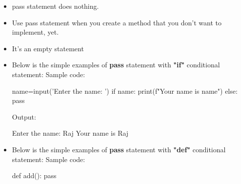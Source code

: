 \setlength{\columnsep}{3pt}


\begin{flushleft}

	
	\begin{itemize}

		\item pass statement does nothing.

		\item Use pass statement when you create a method that you
don't want to implement, yet.
		\item It's an empty statement
		\item Below is the simple examples of \textbf{pass} statement with \textbf{"if"} conditional statement:
		\newline
		Sample code:
		\begin{tcolorbox}[breakable,notitle,boxrule=-0pt,colback=code,colframe=code]
			\color{white}
			\font=8pt
			name=input('Enter the name: ') \newline
			if name: \newline
			\hphantom{} \hphantom{} print(f"Your name is {name}") \newline
			else: \newline
			\hphantom{} \hphantom{} pass
			\font=4pt
		\end{tcolorbox}

		
		Output:
		\begin{tcolorbox}[breakable,notitle,boxrule=-0pt,colback=output,colframe=output]
			\color{black}
			Enter the name: Raj \newline
			Your name is Raj
			\font=4pt
		\end{tcolorbox}

		\item Below is the simple examples of \textbf{pass} statement with \textbf{"def"} conditional statement:
		\newline
		Sample code:
		\begin{tcolorbox}[breakable,notitle,boxrule=-0pt,colback=code,colframe=code]
			\color{white}
			\font=8pt
			def add(): \newline
			\hphantom{} \hphantom{} pass
			\font=4pt
		\end{tcolorbox}
		

	\end{itemize}

\end{flushleft}

\newpage



